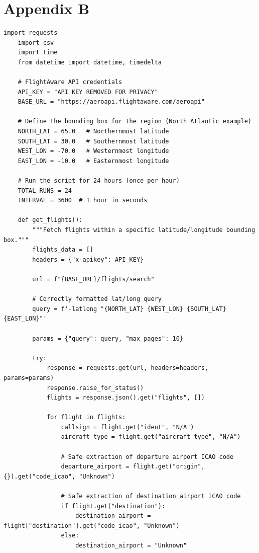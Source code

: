 \documentclass[stu, a4paper, 12pt, floatsintext]{apa7}
\numberwithin{figure}{section}
\numberwithin{table}{section}
\numberwithin{equation}{section}
\begin{document}
\section{Appendix B}
\begin{lstlisting}[style=mypython, caption={24-Hour Flight Data Collection using FlightAware API}]
    import requests
    import csv
    import time
    from datetime import datetime, timedelta
    
    # FlightAware API credentials
    API_KEY = "API KEY REMOVED FOR PRIVACY"
    BASE_URL = "https://aeroapi.flightaware.com/aeroapi"
    
    # Define the bounding box for the region (North Atlantic example)
    NORTH_LAT = 65.0   # Northernmost latitude
    SOUTH_LAT = 30.0   # Southernmost latitude
    WEST_LON = -70.0   # Westernmost longitude
    EAST_LON = -10.0   # Easternmost longitude
    
    # Run the script for 24 hours (once per hour)
    TOTAL_RUNS = 24
    INTERVAL = 3600  # 1 hour in seconds
    
    def get_flights():
        """Fetch flights within a specific latitude/longitude bounding box."""
        flights_data = []
        headers = {"x-apikey": API_KEY}
    
        url = f"{BASE_URL}/flights/search"
    
        # Correctly formatted lat/long query
        query = f'-latlong "{NORTH_LAT} {WEST_LON} {SOUTH_LAT} {EAST_LON}"'
    
        params = {"query": query, "max_pages": 10}
    
        try:
            response = requests.get(url, headers=headers, params=params)
            response.raise_for_status()
            flights = response.json().get("flights", [])
    
            for flight in flights:
                callsign = flight.get("ident", "N/A")
                aircraft_type = flight.get("aircraft_type", "N/A")
    
                # Safe extraction of departure airport ICAO code
                departure_airport = flight.get("origin", {}).get("code_icao", "Unknown")
    
                # Safe extraction of destination airport ICAO code
                if flight.get("destination"):
                    destination_airport = flight["destination"].get("code_icao", "Unknown")
                else:
                    destination_airport = "Unknown"
    

\end{lstlisting}
\end{document}
